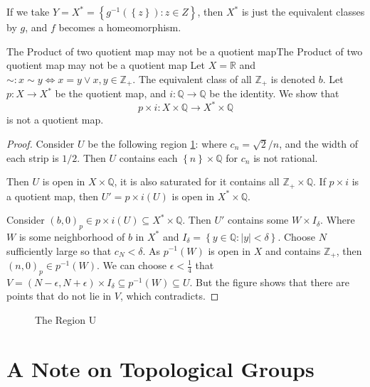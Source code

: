 \documentclass[../main.tex]{subfiles}
\begin{document}
\begin{remark}
	If we take $Y = X^* = \left\{ g^{-1}(\left\{ z \right\}) : z\in Z \right\}$, then $X^*$ is just the equivalent classes by $g$, and $f$ becomes a homeomorphism.
\end{remark}

\begin{example}{The Product of two quotient map may not be a quotient map}{The Product of two quotient map may not be a quotient map}
Let $X = \mathbb{R}$ and $\sim: x\sim y \Leftrightarrow x=y\lor x,y\in \mathbb{Z}_+$. The equivalent class of all $\mathbb{Z}_+$ is denoted $b$. Let $p: X \rightarrow X^*$ be the quotient map, and $i: \mathbb{Q}\rightarrow \mathbb{Q}$ be the identity. We show that
\begin{equation*}
p \times i: X \times \mathbb{Q} \rightarrow X^* \times \mathbb{Q}
\end{equation*}
is not a quotient map.

\begin{proof}
	Consider $U$ be the following region \ref{fig:the-region-u}: where $c_n = \sqrt{2} / n$, and the width of each strip is $1 / 2$. Then $U$ contains each $\left\{ n \right\} \times \mathbb{Q}$ for $c_n $ is not rational. 

	Then $U$ is open in $X \times \mathbb{Q}$, it is also saturated for it contains all $\mathbb{Z}_+ \times \mathbb{Q}$. If $p \times i$ is a quotient map, then $U' = p \times i(U)$ is open in $X^* \times \mathbb{Q}$.

	Consider $(b,0)_p \in p \times i(U) \subseteq  X^* \times \mathbb{Q}$. Then $U'$ contains some $W \times I_{\delta}$. Where $W$ is some neighborhood of $b$ in $X^*$ and $I_{\delta} = \left\{ y\in \mathbb{Q}: |y| < \delta \right\}$. Choose $N$ sufficiently large so that $c_N < \delta$. As $p^{-1}(W)$ is open in $X$ and contains $\mathbb{Z}_+$, then $(n,0)_p \in p^{-1}(W)$. We can choose $\epsilon<\frac{1}{4}$ that $V = (N-\epsilon,N+\epsilon) \times I_{\delta} \subseteq  p^{-1}(W) \subseteq U$. But the figure shows that there are points that do not lie in $V$, which contradicts.
\end{proof}
\end{example}

\begin{figure}[ht]
    \centering
    \caption{The Region U}
    \label{fig:the-region-u}
\end{figure}

\section{A Note on Topological Groups}
\end{document}
